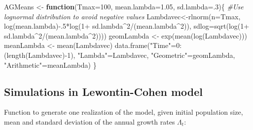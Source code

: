 \documentclass[
]{book}
\newenvironment{Shaded}{\begin{snugshade}}{\end{snugshade}}
\newcommand{\AttributeTok}[1]{\textcolor[rgb]{0.77,0.63,0.00}{#1}}
\newcommand{\CommentTok}[1]{\textcolor[rgb]{0.56,0.35,0.01}{\textit{#1}}}
\newcommand{\ControlFlowTok}[1]{\textcolor[rgb]{0.13,0.29,0.53}{\textbf{#1}}}
\newcommand{\DecValTok}[1]{\textcolor[rgb]{0.00,0.00,0.81}{#1}}
\newcommand{\FloatTok}[1]{\textcolor[rgb]{0.00,0.00,0.81}{#1}}
\newcommand{\FunctionTok}[1]{\textcolor[rgb]{0.00,0.00,0.00}{#1}}
\newcommand{\NormalTok}[1]{#1}
\newcommand{\OtherTok}[1]{\textcolor[rgb]{0.56,0.35,0.01}{#1}}
\newcommand{\SpecialCharTok}[1]{\textcolor[rgb]{0.00,0.00,0.00}{#1}}
\newcommand{\StringTok}[1]{\textcolor[rgb]{0.31,0.60,0.02}{#1}}
\begin{document}
\begin{Shaded}
\begin{Highlighting}[]
\NormalTok{AGMeans }\OtherTok{\textless{}{-}} \ControlFlowTok{function}\NormalTok{(}\AttributeTok{Tmax=}\DecValTok{100}\NormalTok{, }\AttributeTok{mean.lambda=}\FloatTok{1.05}\NormalTok{, }\AttributeTok{sd.lambda=}\NormalTok{.}\DecValTok{3}\NormalTok{)\{}
  \CommentTok{\#Use lognormal distribution to avoid negative values}
\NormalTok{  Lambdavec}\OtherTok{\textless{}{-}}\FunctionTok{rlnorm}\NormalTok{(}\AttributeTok{n=}\NormalTok{Tmax, }\FunctionTok{log}\NormalTok{(mean.lambda)}\SpecialCharTok{{-}}\NormalTok{.}\DecValTok{5}\SpecialCharTok{*}\FunctionTok{log}\NormalTok{(}\DecValTok{1}\SpecialCharTok{+}\NormalTok{ sd.lambda}\SpecialCharTok{\^{}}\DecValTok{2}\SpecialCharTok{/}\NormalTok{(mean.lambda}\SpecialCharTok{\^{}}\DecValTok{2}\NormalTok{)), }\AttributeTok{sdlog=}\FunctionTok{sqrt}\NormalTok{(}\FunctionTok{log}\NormalTok{(}\DecValTok{1}\SpecialCharTok{+}\NormalTok{ sd.lambda}\SpecialCharTok{\^{}}\DecValTok{2}\SpecialCharTok{/}\NormalTok{(mean.lambda}\SpecialCharTok{\^{}}\DecValTok{2}\NormalTok{))))}
\NormalTok{   geomLambda }\OtherTok{\textless{}{-}} \FunctionTok{exp}\NormalTok{(}\FunctionTok{mean}\NormalTok{(}\FunctionTok{log}\NormalTok{(Lambdavec)))}
\NormalTok{   meanLambda }\OtherTok{\textless{}{-}} \FunctionTok{mean}\NormalTok{(Lambdavec)}
  \FunctionTok{data.frame}\NormalTok{(}\StringTok{"Time"}\OtherTok{=}\DecValTok{0}\SpecialCharTok{:}\NormalTok{(}\FunctionTok{length}\NormalTok{(Lambdavec)}\SpecialCharTok{{-}}\DecValTok{1}\NormalTok{), }\StringTok{"Lambda"}\OtherTok{=}\NormalTok{Lambdavec, }\StringTok{"Geometric"}\OtherTok{=}\NormalTok{geomLambda, }\StringTok{"Arithmetic"}\OtherTok{=}\NormalTok{meanLambda)}
\NormalTok{\}}
\end{Highlighting}
\end{Shaded}

\hypertarget{simulations-in-lewontin-cohen-model}{%
\subsection{Simulations in Lewontin-Cohen model}\label{simulations-in-lewontin-cohen-model}}

Function to generate one realization of the model, given initial population size, mean and standard deviation of the annual growth rates \(\Lambda_t\):
\end{document}
